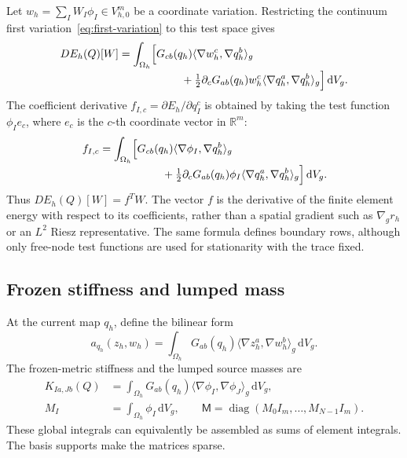 \documentclass[11pt,a4paper]{article}
\newcommand{\R}{\mathbb R}
\newcommand{\dd}{\,\mathrm d}
\newcommand{\ip}[2]{\langle #1,#2\rangle_g}
\newcommand{\diag}{\operatorname{diag}}
\begin{document}
Let \(w_h=\sum_I W_I\phi_I\in V_{h,0}^m\) be a coordinate variation.
Restricting the continuum first variation~\eqref{eq:first-variation}
to this test space gives
\begin{align}
 DE_h(Q)[W]
 &=\int_{\Omega_h}
 \Bigl[G_{cb}(q_h)\ip{\nabla w_h^c}{\nabla q_h^b}
 \nonumber\\[-2pt]
 &\hspace{20mm}
 +\tfrac12\partial_cG_{ab}(q_h)w_h^c
       \ip{\nabla q_h^a}{\nabla q_h^b}\Bigr]\dd V_g.
 \label{eq:discrete-first-variation}
\end{align}
The coefficient derivative \(f_{I,c}=\partial E_h/\partial q_I^c\)
is obtained by taking the test function \(\phi_I e_c\), where \(e_c\)
is the \(c\)-th coordinate vector in \(\R^m\):
\begin{align}
 f_{I,c}
 &=\int_{\Omega_h}
 \Bigl[G_{cb}(q_h)\ip{\nabla\phi_I}{\nabla q_h^b}
 \nonumber\\[-2pt]
 &\hspace{20mm}
 +\tfrac12\partial_cG_{ab}(q_h)\phi_I
       \ip{\nabla q_h^a}{\nabla q_h^b}\Bigr]\dd V_g.
 \label{eq:discrete-gradient}
\end{align}
Thus \(DE_h(Q)[W]=f^TW\). The vector \(f\) is the derivative of the
finite element energy with respect to its coefficients, rather than a
spatial gradient such as \(\nabla_g r_h\) or an \(L^2\) Riesz representative.
The same formula defines boundary rows, although only free-node test
functions are used for stationarity with the trace fixed.

\subsection{Frozen stiffness and lumped mass}
At the current map \(q_h\), define the bilinear form
\begin{equation}
 a_{q_h}(z_h,w_h)=\int_{\Omega_h}
 G_{ab}(q_h)\ip{\nabla z_h^a}{\nabla w_h^b}\dd V_g.
\end{equation}
The frozen-metric stiffness and the lumped source masses are
\begin{align}
 K_{Ia,Jb}(Q)&=\int_{\Omega_h}
 G_{ab}(q_h)\ip{\nabla\phi_I}{\nabla\phi_J}\dd V_g,
 \label{eq:stiffness}\\
 M_I&=\int_{\Omega_h}\phi_I\dd V_g,\qquad
 \mathsf M=\diag(M_0 I_m,\ldots,M_{N-1} I_m).
 \label{eq:mass}
\end{align}
These global integrals can equivalently be assembled as sums of element
integrals. The basis supports make the matrices sparse.
\end{document}
